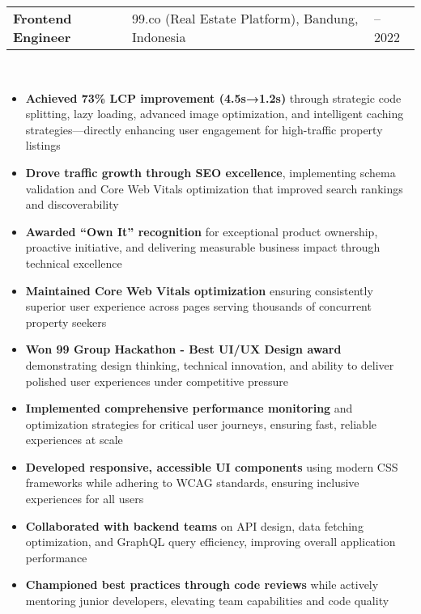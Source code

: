 \documentclass[a4paper, 11pt]{article}
\newcommand{\resumeItem}[1]{
  \item\small{
    {#1 \vspace{-2pt}}
  }
}
\newcommand{\resumeSubheading}[4]{
  \vspace{-2pt}\item
    \begin{tabularx}{0.987\textwidth}[t]{
  >{\raggedright\arraybackslash}X
  >{\centering\arraybackslash}X
  >{\raggedleft\arraybackslash}X }
      \textbf{#1} & #2 & #3 \\
    \end{tabularx}
    \textit{\small#4}\\
    \vspace{-7pt}
}
\newcommand{\resumeItemListStart}{\begin{itemize}[leftmargin=0.22in]}
\newcommand{\resumeItemListEnd}{\end{itemize}\vspace{-20pt}}
\begin{document}
        \resumeSubheading
            {Frontend Engineer}{99.co (Real Estate Platform), Bandung, Indonesia}{2020 -- 2022}{}
            \resumeItemListStart
                \resumeItem{\textbf{Achieved 73\% LCP improvement (4.5s→1.2s)} through strategic code splitting, lazy loading, advanced image optimization, and intelligent caching strategies—directly enhancing user engagement for high-traffic property listings}
                \resumeItem{\textbf{Drove traffic growth through SEO excellence}, implementing schema validation and Core Web Vitals optimization that improved search rankings and discoverability}
                \resumeItem{\textbf{Awarded ``Own It'' recognition} for exceptional product ownership, proactive initiative, and delivering measurable business impact through technical excellence}
                \resumeItem{\textbf{Maintained Core Web Vitals optimization} ensuring consistently superior user experience across pages serving thousands of concurrent property seekers}
                \resumeItem{\textbf{Won 99 Group Hackathon - Best UI/UX Design award} demonstrating design thinking, technical innovation, and ability to deliver polished user experiences under competitive pressure}
                \resumeItem{\textbf{Implemented comprehensive performance monitoring} and optimization strategies for critical user journeys, ensuring fast, reliable experiences at scale}
                \resumeItem{\textbf{Developed responsive, accessible UI components} using modern CSS frameworks while adhering to WCAG standards, ensuring inclusive experiences for all users}
                \resumeItem{\textbf{Collaborated with backend teams} on API design, data fetching optimization, and GraphQL query efficiency, improving overall application performance}
                \resumeItem{\textbf{Championed best practices through code reviews} while actively mentoring junior developers, elevating team capabilities and code quality}
            \resumeItemListEnd
\end{document}

